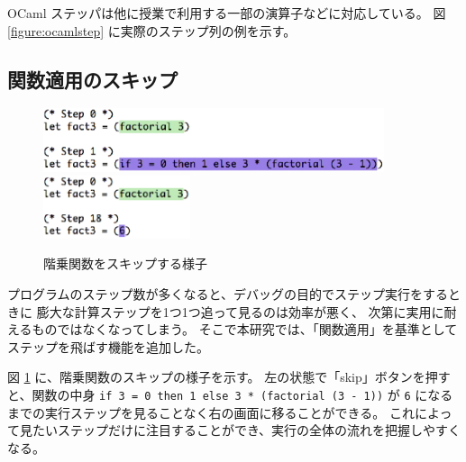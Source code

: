 OCaml ステッパは他に授業で利用する一部の演算子などに対応している。
図 \ref{figure:ocamlstep} に実際のステップ列の例を示す。


\subsection{関数適用のスキップ}
\label{subsection:skip}

\begin{figure}
  \includegraphics[width=10cm]{6/beforeskip.eps}
  \includegraphics[width=4.3cm]{6/afterskip.eps}
  \caption{階乗関数をスキップする様子}
  \label{figure:factskip}
\end{figure}

プログラムのステップ数が多くなると、デバッグの目的でステップ実行をするときに
膨大な計算ステップを1つ1つ追って見るのは効率が悪く、
次第に実用に耐えるものではなくなってしまう。
そこで本研究では、「関数適用」を基準としてステップを飛ばす機能を追加した。

図 \ref{figure:factskip} に、階乗関数のスキップの様子を示す。
左の状態で「skip」ボタンを押すと、関数の中身
\texttt{if 3 = 0 then 1 else 3 * (factorial (3 - 1))} が
\texttt{6} になるまでの実行ステップを見ることなく右の画面に移ることができる。
これによって見たいステップだけに注目することができ、実行の全体の流れを把握しやすくなる。

